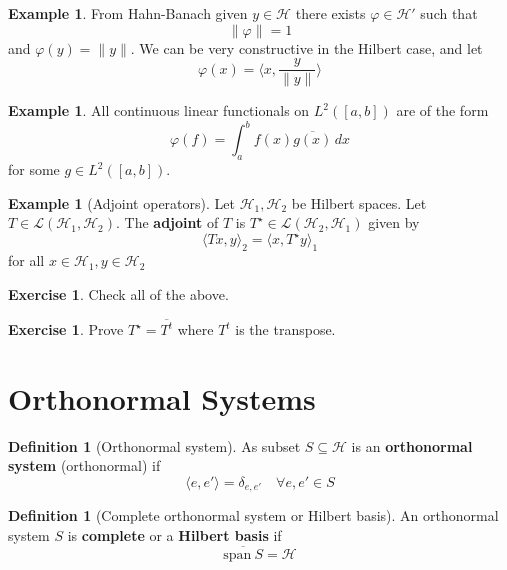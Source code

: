 \documentclass[10pt, oneside, reqno]{amsbook}
\theoremstyle{plain}%
\theoremstyle{definition}
\newtheorem{defn}[thm]{Definition}
\newtheorem{exmp}[thm]{Example}
\newtheorem{exer}[thm]{Exercise}
\theoremstyle{remark}
\newcommand{\Hil}{\mathcal{H}}
\renewcommand{\phi}{\varphi}
\newcommand{\spans}{\text{span}\ }
\begin{document}
\begin{exmp}
    From Hahn-Banach given $y \in \Hil$ there exists $\phi \in \Hil'$ such that \[
        \| \phi \| = 1
    \] and $\phi(y) = \| y \|$. We can be very constructive in the Hilbert case, and let \[
        \phi(x) = \langle x, \frac{y}{\| y \|} \rangle
    \] 
\end{exmp}
\begin{exmp}
    All continuous linear functionals on $L^2([a,b])$ are of the form \[
        \phi(f) = \int_a^b f(x) \overline{g(x)} \, dx 
    \] for some $g \in L^2([a,b])$.
\end{exmp}

\begin{exmp}[Adjoint operators]
    Let $\Hil_1, \Hil_2$ be Hilbert spaces.  Let $ T \in \mathcal{L}(\Hil_1, \Hil_2)$.  The \textbf{adjoint} of $T$ is $T^\star \in \mathcal{L}(\Hil_2, \Hil_1)$ given by \[
        \langle T x, y \rangle_2 = \langle x, T^\star y \rangle_1
    \] for all $x \in \Hil_1, y \in \Hil_2$
\end{exmp}

\begin{exer}
    Check all of the above.
\end{exer}

\begin{exer}
    Prove $T^\star = \overline{T^t}$ where $T^t$ is the transpose.   
\end{exer}


\section{Orthonormal Systems} %
\label{sec:orthonormal_systems}

\begin{defn}[Orthonormal system]
    As subset $S \subseteq \Hil$ is an \textbf{orthonormal system} (orthonormal) if \[
        \langle e, e' \rangle = \delta_{e, e'} \quad \forall e, e' \in S
    \]
\end{defn}

\begin{defn}[Complete orthonormal system or Hilbert basis]
    An orthonormal system $S$ is \textbf{complete} or a \textbf{Hilbert basis} if \[
        \overline{\spans S} = \Hil
    \]
\end{defn}
\end{document}
